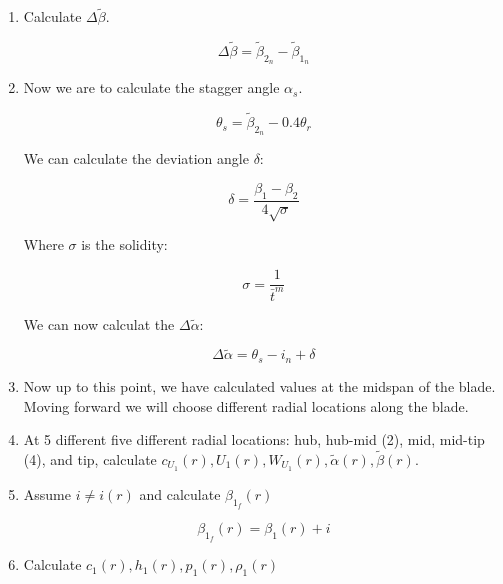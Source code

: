 \documentclass[titlepage]{article}
\begin{document}
\begin{enumerate}
    \item Calculate $\Delta \tilde{\beta}$.
    
    \begin{equation}
        \Delta \tilde{\beta} = \tilde{\beta}_{2_{n}} - \tilde{\beta}_{1_{n}}
    \end{equation}

    \item Now we are to calculate the stagger angle $\alpha_{s}$.
    
    \begin{equation}
        \theta_{s} = \tilde{\beta}_{2_{n}} - 0.4 \theta_{r}
    \end{equation}

    We can calculate the deviation angle $\delta$:

    \begin{equation}
        \delta = \frac{\beta_{1} - \beta_{2}}{4 \sqrt{\sigma}}
    \end{equation}

    Where $\sigma$ is the solidity:

    \begin{equation}
        \sigma = \frac{1}{\bar{t}^{m}}
    \end{equation}

    We can now calculat the $\Delta \tilde{\alpha}$:

    \begin{equation}
        \Delta \tilde{\alpha} = \theta_{s} - i_{n} + \delta
    \end{equation}

    \item Now up to this point, we have calculated values at the midspan of the blade. Moving
    forward we will choose different radial locations along the blade.

    \item At 5 different five different radial locations: hub, hub-mid (2), mid, mid-tip (4), and tip,
    calculate $c_{U_{1}}(r), U_{1}(r), W_{U_{1}}(r), \tilde{\alpha}(r), \tilde{\beta}(r)$.

    \item Assume $i \neq i(r)$ and calculate $\beta_{1_{f}}(r)$ 
    
    \begin{equation}
        \beta_{1_{f}}(r) = \beta_{1}(r) + i
    \end{equation}

    
    \item Calculate $c_{1}(r), h_{1}(r), p_{1}(r), \rho_{1}(r)$ 
    


\end{enumerate}
\end{document}
